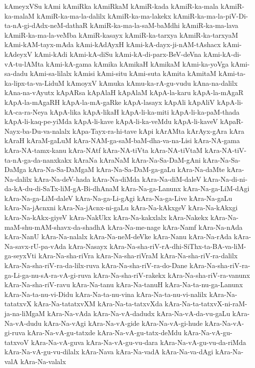 {kAmeyxVSu
kAmi
kAmiRka
kAmiRkaM
kAmiR-kada
kAmiR-ka-mala
kAmiR-ka-malaM
kAmiR-ka-ma-la-dalilx
kAmiR-ka-ma-lakekx
kAmiR-ka-ma-la-piV-Di-ta-nA-gi-dAdx-neM-dathaR
kAmiR-ka-ma-la-saM-baMdhi
kAmiR-ka-ma-lava
kAmiR-ka-ma-la-veMba
kAmiR-kasayx
kAmiR-ka-tarxya
kAmiR-ka-tarxyaM
kAmi-kAM-tayx-mAda
kAmi-kAdAyxH
kAmi-kA-dayx-ji-nAM-tAshacx
kAmi-kAdeyxV
kAmi-kAdi
kAmi-kA-diSu
kAmi-kA-di-parx-BeV-deVna
kAmi-kA-di-vA-tu-lAMta
kAmi-kA-gama
kAmika
kAmikaH
kAmikaM
kAmi-ka-yoVga
kAmi-sa-dadu
kAmi-sa-lilalx
kAmisi
kAmi-situ
kAmi-suta
kAmita
kAmitaM
kAmi-ta-ka-lipx-ta-va-LiduM
kAmoyxV
kAmuka
kAmu-ka-rA-gu-vudu
kAna-na-dalilx
kAna-na-vAyutx
kApARsa
kApAlaH
kApAlaM
kApA-la-karu
kApA-la-mAgaR
kApA-la-mAgaRH
kApA-la-mA-gaRke
kApA-lasayx
kApAli
kApAliV
kApA-li-kA-ca-ra-Neya
kApA-lika
kApA-likaH
kApA-li-ka-miti
kApA-li-ka-paM-thada
kApA-li-kaq-pe-yiMda
kApA-li-kave
kApA-li-ka-veMdu
kApA-li-kaveV
kApaR-Nayx-ba-Du-va-nalalx
kApa-Tayx-ra-hi-tave
kApi
kArAMta
kArAyx-gAra
kAra
kAraH
kAraM-gaLuM
kAra-NAM-ga-saM-baM-dha-va-na-Lisi
kAra-NA-gama
kAra-NA-tamx-kanu
kAra-NAtf
kAra-NA-tiVta
kAra-NA-tiVtaM
kAra-NA-tiV-ta-nA-ga-da-nanxkakx
kAraNa
kAraNaM
kAra-Na-Sa-DaM-gAni
kAra-Na-Sa-DaMga
kAra-Na-Sa-DaMgaM
kAra-Na-Sa-DaM-ga-gaLu
kAra-Na-daMte
kAra-Na-dalilx
kAra-Na-deV-hada
kAra-Na-diMda
kAra-Na-diM-daleV
kAra-Na-di-ni-da-kA-du-di-SaTx-liM-gA-Bi-dhAnaM
kAra-Na-ga-Lanunx
kAra-Na-ga-LiM-dAgi
kAra-Na-ga-LiM-daleV
kAra-Na-ga-Li-gAgi
kAra-Na-ga-Live
kAra-Na-gaLu
kAra-Na-jAcnxni
kAra-Na-jAcnx-ni-gaLu
kAra-Na-kAkxgeV
kAra-Na-kAkxgi
kAra-Na-kAkx-giyeV
kAra-NakUkx
kAra-Na-kakxlalx
kAra-Nakekx
kAra-Na-maM-shu-mAM-shavx-da-shadhA
kAra-Na-me-nage
kAra-Namf
kAra-Na-nAda
kAra-NanU
kAra-Na-nalalx
kAra-Na-neM-deVke
kAra-Nanu
kAra-Na-rAda
kAra-Na-savx-rU-pa-vAda
kAra-Nasayx
kAra-Na-sha-riV-rA-dhi-SiThx-ta-BA-va-liM-ga-seyxVti
kAra-Na-sha-riVra
kAra-Na-sha-riVraM
kAra-Na-sha-riV-ra-dalilx
kAra-Na-sha-riV-ra-da-lilx-ruva
kAra-Na-sha-riV-ra-do-Dane
kAra-Na-sha-riV-ra-ga-Li-ga-nu-sA-ra-vA-gi-ruva
kAra-Na-sha-riV-rakekx
kAra-Na-sha-riV-ra-vanunx
kAra-Na-sha-riV-ravu
kAra-Na-tanu
kAra-Na-tanuH
kAra-Na-ta-nu-ga-Lanunx
kAra-Na-ta-nu-vi-Didu
kAra-Na-ta-nu-vina
kAra-Na-ta-nu-vi-nalilx
kAra-Na-tatatxvX
kAra-Na-tatatxvXM
kAra-Na-ta-tatxvXda
kAra-Na-ta-tatxvX-ni-raM-ja-na-liMgaM
kAra-Na-vAda
kAra-Na-vA-dadudx
kAra-Na-vA-da-vu-gaLu
kAra-Na-vA-dudu
kAra-Na-vAgi
kAra-Na-vA-gide
kAra-Na-vA-gi-hude
kAra-Na-vA-gi-ruva
kAra-Na-vA-gu-tatxde
kAra-Na-vA-gu-tatx-deMdu
kAra-Na-vA-gu-tatxvoV
kAra-Na-vA-guva
kAra-Na-vA-gu-vu-dara
kAra-Na-vA-gu-vu-da-riMda
kAra-Na-vA-gu-vu-dilalx
kAra-Nava
kAra-Na-vadA
kAra-Na-va-dAgi
kAra-Na-valA
kAra-Na-valalx
}
